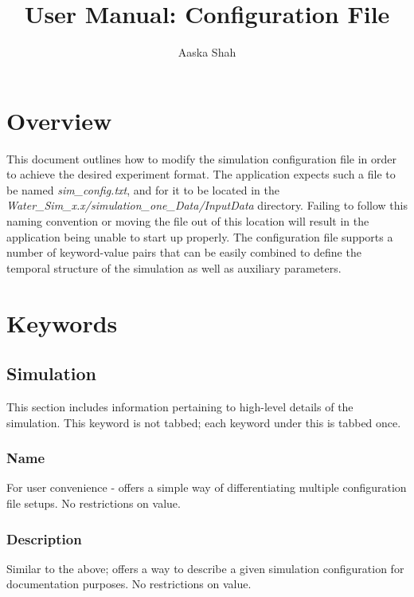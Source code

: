 \documentclass{article}
\title{User Manual: Configuration File}
\author{Aaska Shah}
\begin{document}
\maketitle

\section*{Overview}
This document outlines how to modify the simulation configuration file in order to achieve the desired experiment format. The application expects such a file to be named \textit{sim\_config.txt}, and for it to be located in the \textit{Water\_Sim\_x.x\slash simulation\_one\_Data\slash InputData} directory. Failing to follow this naming convention or moving the file out of this location will result in the application being unable to start up properly. The configuration file supports a number of keyword-value pairs that can be easily combined to define the temporal structure of the simulation as well as auxiliary parameters. 

\section*{Keywords}
\subsection*{Simulation}
This section includes information pertaining to high-level details of the simulation. This keyword is not tabbed; each keyword under this is tabbed once.

\subsubsection*{Name} For user convenience - offers a simple way of differentiating multiple configuration file setups. No restrictions on value. 

%
%

\subsubsection*{Description} Similar to the above; offers a way to describe a given simulation configuration for documentation purposes. No restrictions on value. 
\end{document}
